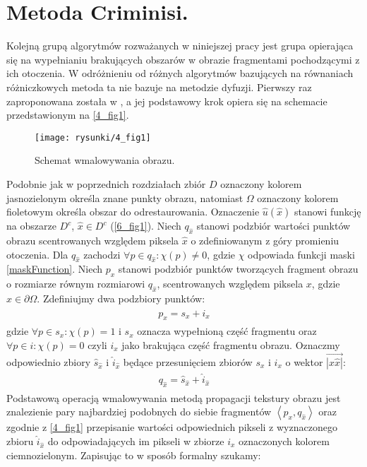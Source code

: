 \documentclass[12pt, twoside, openany]{report}
\theoremstyle{definition}
\begin{document}
\section{Metoda Criminisi.}
\label{ssec:crimMetod}
Kolejną grupą algorytmów rozważanych w niniejszej pracy jest grupa opierająca się na wypełnianiu brakujących obszarów w obrazie fragmentami pochodzącymi z ich otoczenia. W odróżnieniu od różnych algorytmów bazujących na równaniach różniczkowych metoda ta nie bazuje na metodzie dyfuzji. Pierwszy raz zaproponowana została w \cite{efros1999texture}, a jej podstawowy krok opiera się na schemacie przedstawionym na \autoref{4_fig1}.
\begin{figure}[!h]
	\centering
	\texttt{[image: rysunki/4\_fig1]}
	\caption{Schemat wmalowywania obrazu.}
	\label{4_fig1}
\end{figure}
Podobnie jak w poprzednich rozdziałach zbiór $D$ oznaczony kolorem jasnozielonym określa znane punkty obrazu, natomiast $\Omega$ oznaczony kolorem fioletowym określa obszar do odrestaurowania.
Oznaczenie $\hat{u}(\hat{x})$ stanowi funkcję na obszarze $D^c$, $\hat{x}  \in D^c$ (\autoref{6_fig1}).
Niech $q_{\hat{x}}$ stanowi podzbiór wartości punktów obrazu scentrowanych względem piksela $\hat{x}$ o zdefiniowanym z góry promieniu otoczenia.
Dla $q_{\hat{x}}$ zachodzi $\forall p \in q_{\hat{x}} : \chi(p) \neq 0$, gdzie $\chi$ odpowiada funkcji maski \eqref{maskFunction}.
Niech $p_{x}$ stanowi podzbiór punktów tworzących fragment obrazu o rozmiarze równym rozmiarowi $q_{\hat{x}}$, scentrowanych względem piksela $x$, gdzie $x \in \partial \Omega$.
Zdefiniujmy dwa podzbiory punktów:
\begin{align}
\begin{aligned}
p_{x} = s_x + i_x
\end{aligned}
\end{align}
gdzie $\forall p \in s_x : \chi(p) = 1$ i $s_x$ oznacza wypełnioną część fragmentu oraz $\forall p \in i : \chi(p) = 0$ czyli $i_x$ jako brakująca część fragmentu obrazu.  
Oznaczmy odpowiednio zbiory $\hat{s}_{\hat{x}}$ i $\hat{i}_{\hat{x}}$ będące przesunięciem zbiorów $s_x$ i $i_x$ o wektor $\overrightarrow{|x \hat{x}|}$:
\begin{align}
\begin{aligned}
q_{\hat{x}} = \hat{s}_{\hat{x}} + \hat{i}_{\hat{x}}
\end{aligned}
\end{align}
Podstawową operacją wmalowywania metodą propagacji tekstury obrazu jest znalezienie pary
 najbardziej podobnych do siebie fragmentów $\left\langle p_{x}, q_{\hat{x}} \right\rangle $ oraz zgodnie z \autoref{4_fig1} przepisanie wartości odpowiednich pikseli z wyznaczonego zbioru $\hat{i}_{\hat{x}}$ do odpowiadających im pikseli w zbiorze $i_x$ oznaczonych kolorem ciemnozielonym. Zapisując to w sposób formalny szukamy:
\end{document}
